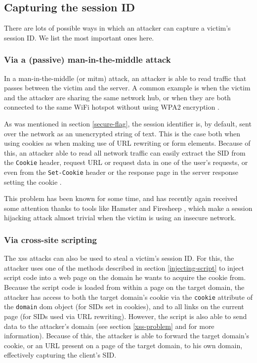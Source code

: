 \subsection{Capturing the session ID}\label{capturing}

There are lots of possible ways in which an attacker can capture a victim's session ID. We list the most important ones here.

\subsubsection{Via a (passive) man-in-the-middle attack}

In a man-in-the-middle (or \gls{mitm}) attack, an attacker is able to read traffic that passes between the victim and the server. A common example is when the victim and the attacker are sharing the same network hub, or when they are both connected to the same WiFi hotspot without using WPA2 encryption \cite{Arana2006}.

As was mentioned in section \ref{secure-flag}, the session identifier is, by default, sent over the network as an unencrypted string of text. This is the case both when using cookies as when making use of URL rewriting or form elements. Because of this, an attacker able to read all network traffic can easily extract the SID from the \texttt{Cookie} header, request URL or request data in one of the user's requests, or even from the \texttt{Set-Cookie} header or the response page in the server response setting the cookie \cite{Adida2008}.

This problem has been known for some time, and has recently again received some attention thanks to tools like Hamster \cite{Graham2007} and Firesheep \cite{Butler2010}, which make a session hijacking attack almost trivial when the victim is using an insecure network.

\subsubsection{Via cross-site scripting}

The \gls{xss} attacks can also be used to steal a victim's session ID. For this, the attacker uses one of the methods described in section \ref{injecting-script} to inject script code into a web page on the domain he wants to acquire the cookie from. Because the script code is loaded from within a page on the target domain, the attacker has access to both the target domain's cookie via the \texttt{cookie} attribute of the \texttt{domain} \gls{dom} object (for SIDs set in cookies), and to all links on the current page (for SIDs used via URL rewriting). However, the script is also able to send data to the attacker's domain (see section \ref{xss-problem} and \cite{Klein2002} for more information). Because of this, the attacker is able to forward the target domain's cookie, or an URL present on a page of the target domain, to his own domain, effectively capturing the client's SID.

